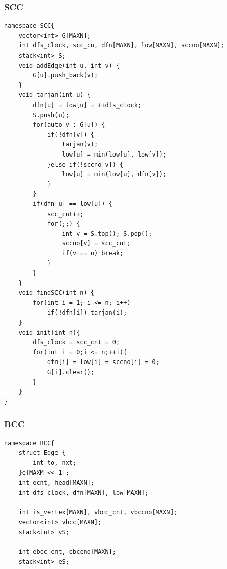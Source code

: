 \documentclass[10pt]{ctexart}
\begin{document}
{\subsubsection{SCC}
\begin{lstlisting}
namespace SCC{
    vector<int> G[MAXN];
    int dfs_clock, scc_cn, dfn[MAXN], low[MAXN], sccno[MAXN];
    stack<int> S;
    void addEdge(int u, int v) {
        G[u].push_back(v);
    }
    void tarjan(int u) {
        dfn[u] = low[u] = ++dfs_clock;
        S.push(u);
        for(auto v : G[u]) {
            if(!dfn[v]) {
                tarjan(v);
                low[u] = min(low[u], low[v]);
            }else if(!sccno[v]) {
                low[u] = min(low[u], dfn[v]);
            }
        }
        if(dfn[u] == low[u]) {
            scc_cnt++;
            for(;;) {
                int v = S.top(); S.pop();
                sccno[v] = scc_cnt;
                if(v == u) break;
            }
        }
    }
    void findSCC(int n) {
        for(int i = 1; i <= n; i++)
            if(!dfn[i]) tarjan(i);
    }
    void init(int n){
        dfs_clock = scc_cnt = 0;
        for(int i = 0;i <= n;++i){
            dfn[i] = low[i] = sccno[i] = 0;
            G[i].clear();
        }
    }
}
\end{lstlisting}
\subsubsection{BCC}
\begin{lstlisting}
namespace BCC{
    struct Edge {
        int to, nxt;
    }e[MAXM << 1];
    int ecnt, head[MAXN];
    int dfs_clock, dfn[MAXN], low[MAXN];

    int is_vertex[MAXN], vbcc_cnt, vbccno[MAXN];              
    vector<int> vbcc[MAXN];                                   
    stack<int> vS;                                            

    int ebcc_cnt, ebccno[MAXN];                               
    stack<int> eS;                                            


\end{lstlisting}}
\end{document}
